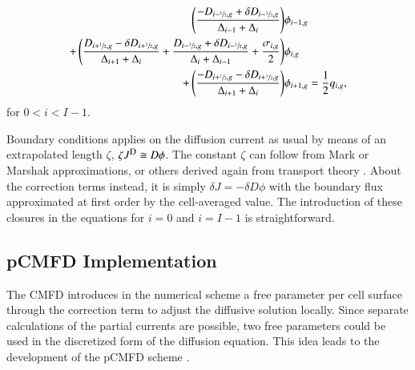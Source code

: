 %
\begin{equation}
  \label{eq:CMFD-diff-rearranged}
  \begin{split}
  \left( \frac{-D_{i-\sfrac{1}{2},g} + \delta D_{i-\sfrac{1}{2},g}}{\Delta_{i-1} + \Delta_i}\right) &\phi_{i-1,g} \\
  + \left(\frac{D_{i+\sfrac{1}{2},g} - \delta D_{i+\sfrac{1}{2},g}}{\Delta_{i+1} + \Delta_i} + \frac{D_{i-\sfrac{1}{2},g} + \delta D_{i-\sfrac{1}{2},g}}{\Delta_i + \Delta_{i-1}} + \frac{\sigma_{i,g}}{2}\right) &\phi_{i,g} \\
  + \left( \frac{-D_{i+\sfrac{1}{2},g} - \delta D_{i+\sfrac{1}{2},g}}{\Delta_{i+1} + \Delta_i} \right) &\phi_{i+1,g} = \frac{1}{2}q_{i,g},
  \end{split}
\end{equation}
for $0 < i < I-1$.

Boundary conditions applies on the diffusion current as usual by means of an extrapolated length $\zeta$, \ie{} $\zeta \jD \cong D \phi$. The constant $\zeta$ can follow from Mark or Marshak approximations, or others derived again from transport theory \cite{meghreblian1960reactor}. About the correction terms instead, it is simply $\delta J = -\delta D \phi$ with the boundary flux approximated at first order by the cell-averaged value. The introduction of these closures in the equations for $i=0$ and $i=I-1$ is straightforward.

\subsection{pCMFD Implementation}
\label{sec:RM-pCMFD}

The CMFD introduces in the numerical scheme a free parameter per cell surface through the correction term to adjust the diffusive solution locally. Since separate calculations of the partial currents are possible, two free parameters could be used in the discretized form of the diffusion equation. This idea leads to the development of the pCMFD scheme \cite{cho2003comparison}.

